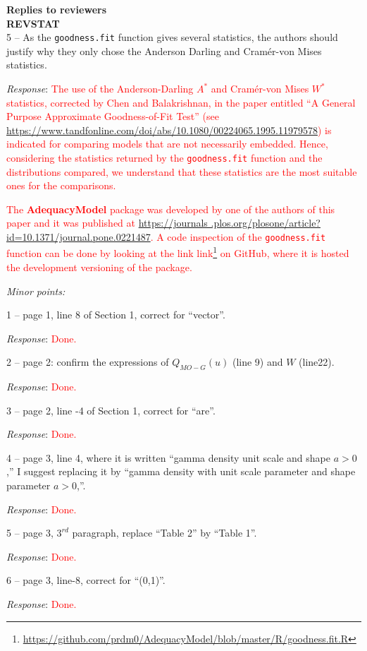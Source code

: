 \documentclass[version=last,12pt,{"maintainersDelight"},letterpaper,]{scrlttr2}
\renewcommand{\href}[2]{#2\footnote{\url{#1}}}
\begin{document}
\begin{letter}{\textbf{Replies to reviewers}\\\textbf{REVSTAT}\\}
5 -- As the \texttt{goodness.fit} function gives several statistics, the authors should justify why they only chose the Anderson Darling and Cram\'er-von Mises statistics.

\emph{Response}:
\textcolor{red}{The use of the Anderson-Darling  $A^*$ and Cram\'er-von Mises $W^*$  statistics, corrected by Chen and Balakrishnan, in the paper entitled ``A General Purpose Approximate Goodness-of-Fit Test'' (see   \url{https://www.tandfonline.com/doi/abs/10.1080/00224065.1995.11979578}) is indicated for comparing mo\-dels that are not necessarily embedded. Hence, considering the statistics returned by the \texttt{goodness.fit} function and the distributions compared, we understand that these statistics are the most suitable ones for 
the comparisons.}

\textcolor{red}{The \textbf{AdequacyModel} package was developed 
by one of the authors of this paper and it was published at   \url{https://journals .plos.org/plosone/article?id=10.1371/journal.pone.0221487}. 
A code inspection of the \texttt{goodness.fit} function can be done by looking at the link   \href{https://github.com/prdm0/AdequacyModel/blob/master/R/goodness.fit.R}{link} on GitHub, where it is hosted the development versioning of the package.}

\emph{Minor points:}

1 -- page 1, line 8 of Section 1, correct for ``vector''.

\emph{Response}: \textcolor{red}{Done.}

2 -- page 2: confirm the expressions of \(Q_{MO-G}(u)\) (line 9) and
\(W\) (line22).

\emph{Response}: \textcolor{red}{Done.}

3 -- page 2, line -4 of Section 1, correct for ``are''.

\emph{Response}: \textcolor{red}{Done.}

4 -- page 3, line 4, where it is written ``gamma density unit scale and shape \(a>0\),'' I suggest replacing it by ``gamma density with unit scale parameter and shape parameter \(a>0\),''.

\emph{Response}: \textcolor{red}{Done.}

5 -- page 3, \(3^{rd}\) paragraph, replace ``Table 2'' by ``Table 1''.

\emph{Response}: \textcolor{red}{Done.}

6 -- page 3, line-8, correct for ``(0,1)''.

\emph{Response}: \textcolor{red}{Done.}


\end{letter}
\end{document}
